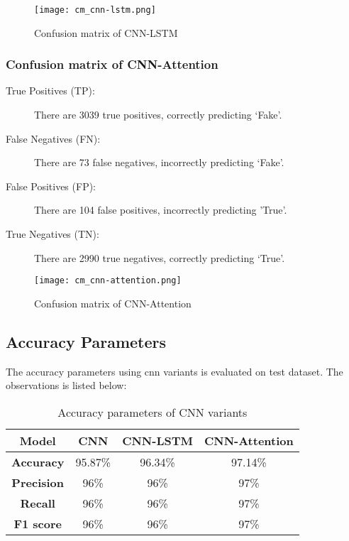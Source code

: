 \begin{figure}[h]
    \centering
    \texttt{[image: cm\_cnn-lstm.png]}
    \caption{Confusion matrix of CNN-LSTM}
    \label{fig:cm_cnn-lstm}
\end{figure}
\clearpage
\subsubsection{Confusion matrix of CNN-Attention}

\begin{description}
    \item[True Positives (TP):] There are 3039 true positives, correctly predicting ‘Fake’.
    \item[False Negatives (FN):] There are 73 false negatives, incorrectly predicting ‘Fake’.
    \item[False Positives (FP):] There are 104 false positives, incorrectly predicting 'True'.
    \item[True Negatives (TN): ] There are 2990 true negatives, correctly predicting ‘True’.
\end{description}

\begin{figure}[h]
    \centering
    \texttt{[image: cm\_cnn-attention.png]}
    \caption{Confusion matrix of CNN-Attention}
    \label{fig:cm_cnn-attention}
\end{figure}


\subsection{Accuracy Parameters} 
The accuracy parameters using \ac{cnn} variants is evaluated on test dataset. The observations is listed below:

\begin{table}[h]
    \caption{Accuracy parameters of CNN variants}
    \centering
    \begin{tabular}{|c|c|c|c|}
    \hline
      \textbf{Model} & \textbf{CNN} & \textbf{CNN-LSTM} & \textbf{CNN-Attention} \\
      \hline
        \textbf{Accuracy} &95.87\%  &96.34\% & 97.14\%\\
        \hline
        \textbf{Precision} & 96\%& 96\%&97\% \\
        \hline
        \textbf{Recall} & 96\%&96\% &97\% \\
       \hline
       \textbf{F1 score} & 96\%&96\% &97\% \\
       \hline
    \end{tabular} 
   
    \label{tab:accuracy_params_of_cnn_variants}
\end{table}

